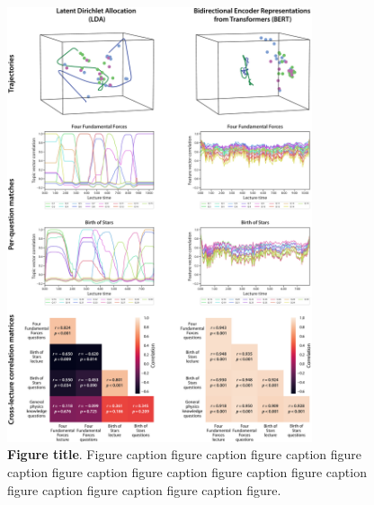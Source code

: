 \documentclass[10pt]{article}
\begin{document}
\begin{figure}[tp]
    \centering
    \includegraphics[width=0.8\textwidth]{figs/model-comparison}

    \caption{\textbf{Figure title}. Figure caption figure caption figure caption figure caption figure caption figure caption figure caption figure caption figure caption figure caption figure caption figure.}

    \label{fig:compare-bert}
\end{figure}



\newpage
\end{document}

